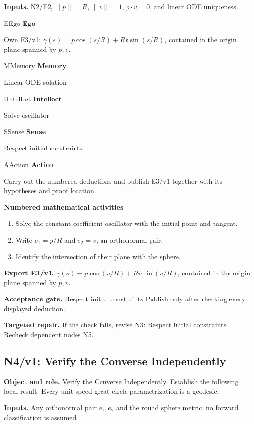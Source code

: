 \documentclass[preprint,12pt,aps,pra,showkeys,amsmath,amssymb,superscriptaddress,floatfix]{revtex4-2}
\theoremstyle{definition}
\theoremstyle{remark}
\newcommand{\mmfaculty}[3]{%
 \begin{mmfacultybox}{#1}{#2}
 {\sffamily\bfseries\color{MMBlue}#2}\par\smallskip #3
 \end{mmfacultybox}}
\newcommand{\field}[2]{\par\smallskip\noindent\textbf{#1.} #2\par}
\begin{document}
\field{Inputs}{N2/E2, \(\|p\|=R\), \(\|v\|=1\), \(p\cdot v=0\), and linear ODE
uniqueness.}

\mmfaculty{E}{Ego}{Own E3/v1: \(\gamma(s)=p\cos(s/R)+Rv\sin(s/R)\), contained in the origin
plane spanned by \(p,v\).}

\mmfaculty{M}{Memory}{Linear ODE solution}

\mmfaculty{I}{Intellect}{Solve oscillator}

\mmfaculty{S}{Sense}{Respect initial constraints}

\mmfaculty{A}{Action}{Carry out the numbered deductions and publish E3/v1 together with its
hypotheses and proof location.}

\smallskip\noindent\textbf{Numbered mathematical activities}

\begin{enumerate}[label=N3.\arabic*,leftmargin=3.4em]

\item Solve the constant-coefficient oscillator with the initial point and
tangent.

\item Write \(e_1=p/R\) and \(e_2=v\), an orthonormal pair.

\item Identify the intersection of their plane with the sphere.

\end{enumerate}

\field{Export E3/v1}{\(\gamma(s)=p\cos(s/R)+Rv\sin(s/R)\), contained in the origin plane
spanned by \(p,v\).}

\field{Acceptance gate}{Respect initial constraints Publish only after checking every displayed
deduction.}

\field{Targeted repair}{If the check fails, revise N3: Respect initial constraints Recheck
dependent nodes N5.}

\clearpage

\subsection{N4/v1: Verify the Converse Independently}

\field{Object and role}{Verify the Converse Independently. Establish the following local result:
Every unit-speed great-circle parametrization is a geodesic.}

\field{Inputs}{Any orthonormal pair \(e_1,e_2\) and the round sphere metric; no forward
classification is assumed.}
\end{document}
